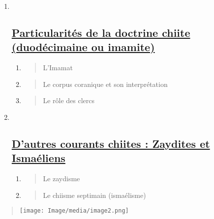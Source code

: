 \begin{enumerate}
\def\labelenumi{\Roman{enumi}.}
\setcounter{enumi}{2}
\item ~
  \hypertarget{particularituxe9s-de-la-doctrine-chiite-duoduxe9cimaine-ou-imamite}{%
  \subsection{\texorpdfstring{\underline{Particularités de la doctrine
  chiite (duodécimaine ou
  imamite)}}{Particularités de la doctrine chiite (duodécimaine ou imamite)}}\label{particularituxe9s-de-la-doctrine-chiite-duoduxe9cimaine-ou-imamite}}

  \begin{enumerate}
  \def\labelenumii{\arabic{enumii}.}
  \item
    \begin{quote}
    L'Imamat
    \end{quote}
  \item
    \begin{quote}
    Le corpus coranique et son interprétation
    \end{quote}
  \item
    \begin{quote}
    Le rôle des clercs
    \end{quote}
  \end{enumerate}
\item ~
  \hypertarget{dautres-courants-chiites-zaydites-et-ismauxe9liens}{%
  \subsection{\texorpdfstring{\underline{D'autres courants chiites :
  Zaydites et
  Ismaéliens}}{D'autres courants chiites : Zaydites et Ismaéliens}}\label{dautres-courants-chiites-zaydites-et-ismauxe9liens}}

  \begin{enumerate}
  \def\labelenumii{\arabic{enumii}.}
  \item
    \begin{quote}
    Le zaydisme
    \end{quote}
  \item
    \begin{quote}
    Le chiisme septimain (ismaélisme)
    \end{quote}
  \end{enumerate}
\end{enumerate}

\begin{quote}
\texttt{[image: Image/media/image2.png]}
\end{quote}

